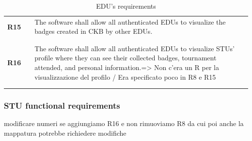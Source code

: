 \begin{longtable}[H]{l l p{12cm}}
    \textbf{R15} & \vline & The software shall allow all authenticated EDUs to visualize the badges created in CKB by other EDUs.                                                                                                                                                                           \\
                 &        &                                                                                                                                                                                                                                                                                 \\\hline & & \\
    \textbf{R16} & \vline & {\color{red} The software shall allow all authenticated EDUs to visualize STUs' profile where they can see their collected badges, tournament attended, and personal information.=> Non c'era un R per la visualizzazione del profilo / Era specificato poco in R8 e R15}  \\
                 &        &                                                                                                                                                                                                                                                                                 \\
    \hline
    \caption{EDU's requirements}
\end{longtable}

\subsubsection*{STU functional requirements}

{\color{red} modificare numeri se aggiungiamo R16 e non rimuoviamo R8 da cui poi anche la mappatura potrebbe richiedere modifiche} \\

